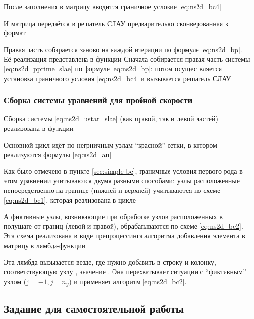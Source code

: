 После заполнения в матрицу вводится граничное условие \eqref{eq:ns2d_bc4}

И матрица передаётся в решатель СЛАУ предварительно сконверованная в формат 

Правая часть собирается заново на каждой итерации по формуле \eqref{eq:ns2d_bp}.
Её реализация представлена в функции
Сначала собирается правая часть системы \eqref{eq:ns2d_pprime_slae} по формуле \eqref{eq:ns2d_bp}:
потом осуществляется установка граничного условия \eqref{eq:ns2d_bc4}
и вызывается решатель СЛАУ

\subsubsection{Сборка системы уравнений для пробной скорости}

Сборка системы \eqref{eq:ns2d_ustar_slae} (как правой, так и левой частей) реализована
в функции

Основной цикл идёт по негрничным узлам ``красной'' сетки,
в котором реализуются формулы \eqref{eq:ns2d_au}

Как было отмечено в пункте \ref{sec:simple-bc},
граничные условия первого рода в этом уравнении
учитываются двумя разными способами:
узлы расположенные непосредственно на границе (нижней и верхней)
учитываются по схеме \eqref{eq:ns2d_bc1}, которая реализована в цикле

А фиктивные узлы, возникающие при обработке
узлов расположенных в полушаге от границ (левой и правой),
обрабатываются по схеме \eqref{eq:ns2d_bc2}.
Эта схема реализована в виде
препроцессинга алгоритма добавления элемента в матрицу в лямбда-функции

Эта лямбда вызывается везде, где нужно добавить в строку 
и колонку, соответствующую узлу , значение .
Она перехватывает ситуации с ``фиктивным'' узлом ($j=-1, j=n_y$)
и применяет алгоритм \eqref{eq:ns2d_bc2}.


\subsection{Задание для самостоятельной работы}

